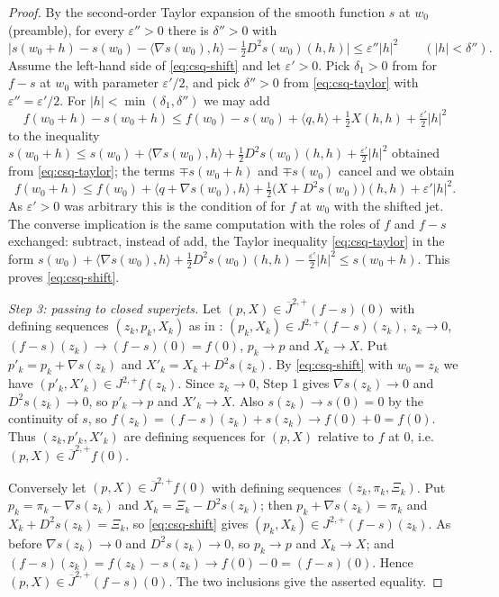 \begin{proof}
By the second-order Taylor expansion of the smooth function $s$ at $w_0$
(preamble), for every $\varepsilon''>0$ there is $\delta''>0$ with
\begin{equation}\label{eq:csq-taylor}
  \bigl|s(w_0+h)-s(w_0)-\langle\nabla s(w_0),h\rangle
    -\tfrac12D^2s(w_0)(h,h)\bigr|\le\varepsilon''|h|^2\qquad(|h|<\delta'').
\end{equation}
Assume the left-hand side of \eqref{eq:csq-shift} and let $\varepsilon'>0$. Pick
$\delta_1>0$ from  for $f-s$ at $w_0$ with parameter
$\varepsilon'/2$, and pick $\delta''>0$ from \eqref{eq:csq-taylor} with
$\varepsilon''=\varepsilon'/2$. For $|h|<\min(\delta_1,\delta'')$ we may add
\[
  f(w_0+h)-s(w_0+h)\le f(w_0)-s(w_0)+\langle q,h\rangle+\tfrac12X(h,h)
    +\tfrac{\varepsilon'}2|h|^2
\]
to the inequality
$s(w_0+h)\le s(w_0)+\langle\nabla s(w_0),h\rangle
+\tfrac12D^2s(w_0)(h,h)+\tfrac{\varepsilon'}2|h|^2$ obtained from
\eqref{eq:csq-taylor}; the terms $\mp s(w_0+h)$ and $\mp s(w_0)$ cancel and we
obtain
\[
  f(w_0+h)\le f(w_0)+\langle q+\nabla s(w_0),h\rangle
    +\tfrac12\bigl(X+D^2s(w_0)\bigr)(h,h)+\varepsilon'|h|^2 .
\]
As $\varepsilon'>0$ was arbitrary this is the condition of 
for $f$ at $w_0$ with the shifted jet. The converse implication is the same
computation with the roles of $f$ and $f-s$ exchanged: subtract, instead of add,
the Taylor inequality \eqref{eq:csq-taylor} in the form
$s(w_0)+\langle\nabla s(w_0),h\rangle+\tfrac12D^2s(w_0)(h,h)
-\tfrac{\varepsilon'}2|h|^2\le s(w_0+h)$. This proves
\eqref{eq:csq-shift}.

\emph{Step 3: passing to closed superjets.}
Let $(p,X)\in\overline J^{2,+}(f-s)(0)$ with defining sequences
$(z_k,p_k,X_k)$ as in : $(p_k,X_k)\in
J^{2,+}(f-s)(z_k)$, $z_k\to0$, $(f-s)(z_k)\to(f-s)(0)=f(0)$, $p_k\to p$ and
$X_k\to X$. Put $p'_k=p_k+\nabla s(z_k)$ and $X'_k=X_k+D^2s(z_k)$. By
\eqref{eq:csq-shift} with $w_0=z_k$ we have $(p'_k,X'_k)\in J^{2,+}f(z_k)$.
Since $z_k\to0$, Step 1 gives $\nabla s(z_k)\to0$ and $D^2s(z_k)\to0$, so
$p'_k\to p$ and $X'_k\to X$. Also $s(z_k)\to s(0)=0$ by the continuity of $s$,
so $f(z_k)=(f-s)(z_k)+s(z_k)\to f(0)+0=f(0)$. Thus $(z_k,p'_k,X'_k)$ are
defining sequences for $(p,X)$ relative to $f$ at $0$, i.e.
$(p,X)\in\overline J^{2,+}f(0)$.

Conversely let $(p,X)\in\overline J^{2,+}f(0)$ with defining sequences
$(z_k,\pi_k,\Xi_k)$. Put $p_k=\pi_k-\nabla s(z_k)$ and
$X_k=\Xi_k-D^2s(z_k)$; then $p_k+\nabla s(z_k)=\pi_k$ and
$X_k+D^2s(z_k)=\Xi_k$, so \eqref{eq:csq-shift} gives
$(p_k,X_k)\in J^{2,+}(f-s)(z_k)$. As before $\nabla s(z_k)\to0$ and
$D^2s(z_k)\to0$, so $p_k\to p$ and $X_k\to X$; and
$(f-s)(z_k)=f(z_k)-s(z_k)\to f(0)-0=(f-s)(0)$. Hence
$(p,X)\in\overline J^{2,+}(f-s)(0)$. The two inclusions give the asserted
equality.
\end{proof}
